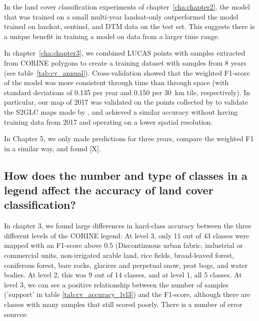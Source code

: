         In the land cover classification experiments of chapter~\ref{cha:chapter2}, the model that was trained on a small multi-year landsat-only outperformed the model trained on landsat, sentinel, and DTM data on the test set. This suggests there is a unique benefit in training a model on data from a larger time range.
        
        In chapter~\ref{cha:chapter3}, we combined LUCAS points with samples extracted from CORINE polygons to create a training dataset with samples from 8 years (see table~\ref{tab:cv_annual}). Cross-validation showed that the weighted F1-score of the model was more consistent through time than through space (with standard deviations of 0.135 per year and 0.150 per 30~km tile, respectively). 
        In particular, our map of 2017 was validated on the points collected by \citep{jenerowicz2021validation} to validate the S2GLC maps made by \citet{malinowski2020automated}, and achieved a similar accuracy without having training data from 2017 and operating on a lower spatial resolution.

        In Chapter 5, we only made predictions for three years, compare the weighted F1 in a similar way, and found [X].

        
    
    \subsection{How does the number and type of classes in a legend affect the accuracy of land cover classification?}
    \label{syn:rq3}

        In chapter 3, we found large differences in hard-class accuracy between the three different levels of the CORINE legend: At level 3, only 11 out of 43 classes were mapped with an F1-score above 0.5 (Discontinuous urban fabric, industrial or commercial units, non-irrigated arable land, rice fields, broad-leaved forest, coniferous forest, bare rocks, glaciers and perpetual snow, peat bogs, and water bodies. At level 2, this was 9 out of 14 classes, and at level 1, all 5 classes. At level 3, we can see a positive relationship between the number of samples ('support' in table \ref{tab:cv_accuracy_lvl3}) and the F1-score, although there are classes with many samples that still scored poorly. There is a number of error sources: 

